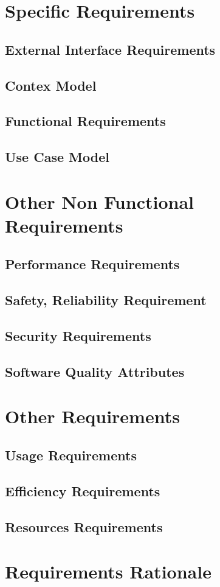 \documentclass{report}
\begin{document}
	\chapter{Specific Requirements}
		\section{External Interface Requirements}
		\section{Contex Model}
		\section{Functional Requirements}
		\section{Use Case Model}
	\chapter{Other Non Functional Requirements}
		\section{Performance Requirements}
		\section{Safety, Reliability Requirement}
		\section{Security Requirements}
		\section{Software Quality Attributes}
	\chapter{Other Requirements}
		\section{Usage Requirements}
		\section{Efficiency Requirements}
		\section{Resources Requirements}
	\chapter{Requirements Rationale}
\end{document}
